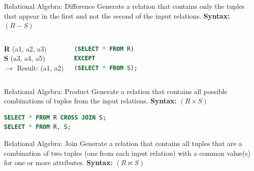 \documentclass[aspectratio=169, 10pt]{beamer}
\begin{document}
\begin{frame}[fragile]{Relational Algebra: Difference}
    Generate a relation that contains only the tuples that appear in the first and not the second of the input relations.
    \vspace{1em}
    \textbf{Syntax:} $(R - S)$
    \vspace{1em}
    \begin{columns}
        \textbf{R} (a1, a2, a3) \\ \textbf{S} (a3, a4, a5) \\
        $\rightarrow$ Result: (a1, a2)
        \begin{lstlisting}[language=SQL]
(SELECT * FROM R)
EXCEPT
(SELECT * FROM S);
        \end{lstlisting}
    \end{columns}
\end{frame}

\begin{frame}[fragile]{Relational Algebra: Product}
    Generate a relation that contains all possible combinations of tuples from the input relations.
    \vspace{1em}
    \textbf{Syntax:} $(R \times S)$
    \vspace{1em}
    \begin{lstlisting}[language=SQL]
SELECT * FROM R CROSS JOIN S;
SELECT * FROM R, S;
    \end{lstlisting}
\end{frame}

\begin{frame}{Relational Algebra: Join}
    Generate a relation that contains all tuples that are a combination of two tuples (one from each input relation) with a common value(s) for one or more attributes.
    \vspace{1em}
    \textbf{Syntax:} $(R \bowtie S)$
\end{frame}
\end{document}
